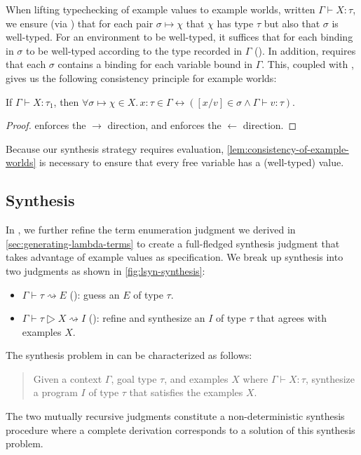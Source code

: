 When lifting typechecking of example values to example worlds, written $Γ ⊢ Χ : τ$, we ensure (via ) that for each pair $σ ↦ χ$ that $χ$ has type $τ$ but also that $σ$ is well-typed.
For an environment to be well-typed, it suffices that for each binding in $σ$ to be well-typed according to the type recorded in $Γ$ ().
In addition,  requires that each $σ$ contains a binding for each variable bound in $Γ$.
This, coupled with , gives us the following consistency principle for example worlds:
\begin{lemma}
  \label{lem:consistency-of-example-worlds}
  If $Γ ⊢ Χ : τ_1$, then $∀σ ↦ χ ∈ Χ.\,x{:}τ \in Γ ↔ ([x/v] \in σ ∧ Γ ⊢ v : τ)$.
\end{lemma}
\begin{proof}
   enforces the $→$ direction, and  enforces the $←$ direction.
\end{proof}
Because our synthesis strategy requires evaluation, \autoref{lem:consistency-of-example-worlds} is necessary to ensure that every free variable has a (well-typed) value.

\subsection{Synthesis}
\label{subsec:synthesis}



In \lsyn{}, we further refine the term enumeration judgment we derived in \autoref{sec:generating-lambda-terms} to create a full-fledged synthesis judgment that takes advantage of example values as specification.
We break up synthesis into two judgments as shown in \autoref{fig:lsyn-synthesis}:
\begin{itemize}
  \item $Γ ⊢ τ ⇝ E$ (): guess an $E$ of type $τ$.
  \item $Γ ⊢ τ ▷ Χ ⇝ I$ (): refine and synthesize an $I$ of type $τ$ that agrees with examples $Χ$.
\end{itemize}
The synthesis problem in \lsyn{} can be characterized as follows:
\begin{quote}
Given a context $Γ$, goal type $τ$, and examples $Χ$ where $Γ ⊢ X : τ$, synthesize a program $I$ of type $τ$ that satisfies the examples $Χ$.
\end{quote}
The two mutually recursive judgments constitute a non-deterministic synthesis procedure where a complete  derivation corresponds to a solution of this synthesis problem.

